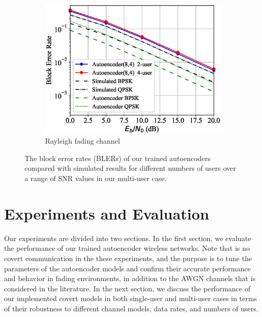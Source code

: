 \begin{figure}[!tp]
\begin{subfigure}{0.28\linewidth}
		\includegraphics[width=\linewidth]{figs/multi_autoencoder_bler_rayleigh}
		\caption{Rayleigh fading channel}	
	\end{subfigure}
	\caption{The block error rates (BLERs) of our trained autoencoders compared with simulated results for different numbers of users over a range of SNR values in our multi-user case.}
	\label{fig:multi_autoencoder_bler}
\end{figure}

\section{Experiments and Evaluation}
\label{s:eval}
Our experiments are divided into two sections. In the first section, we evaluate the performance of our trained autoencoder wireless networks. Note that is no covert communication in the these experiments, and the purpose is to tune the parameters of the autoencoder models and confirm their accurate performance and behavior in fading environments, in addition to the AWGN channels that is considered in the literature. In the next section, we discuss the performance of our implemented covert models in both single-user and multi-user cases in terms of their robustness to different channel models, data rates, and numbers of users.

